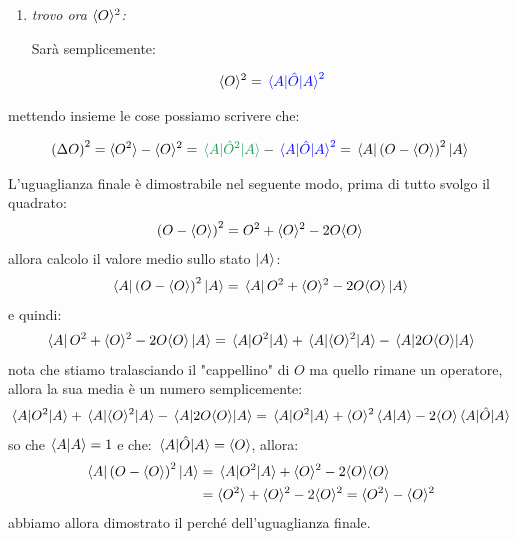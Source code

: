 \begin{itemize}
\begin{enumerate}[label=\arabic*)]
		
	\item \textit{trovo ora $\langle O \rangle^2$:}
		
		Sarà semplicemente:
	
	\begin{align*}
		\langle O \rangle^2 = \textcolor{blue}{\mel{A}{\hat{O}}{A}^2}
	\end{align*}
		
\end{enumerate}

	mettendo insieme le cose possiamo scrivere che:

\begin{nb}
\begin{align*}
	\qty(\Delta O)^2 = \mean{O^2} -\mean{O}^2 =  \textcolor{ForestGreen}{\mel{A}{\hat{O}^2}{A}} - \textcolor{blue}{\mel{A}{\hat{O}}{A}^2} = \mel{A}{ \, \qty(O - \mean{O})^2 \,}{A}
\end{align*}
\end{nb}

\begin{myprf}
	L'uguaglianza finale è dimostrabile nel seguente modo, prima di tutto svolgo il quadrato:
\begin{align*}
	\qty(O - \langle O \rangle)^2 = O^2 + \langle O \rangle^2 - 2O\langle O \rangle
\end{align*}
	allora calcolo il valore medio sullo stato $\ket{A}$:
\begin{align*}
	\mel{A}{\, \qty(O - \langle O \rangle)^2 \, }{A} = \mel{A}{\,  O^2 + \langle O \rangle^2 - 2O\langle O \rangle \, }{A}
\end{align*}
	e quindi:
\begin{align*}
	\mel{A}{\,  O^2 + \langle O \rangle^2 - 2O\langle O \rangle \, }{A} = \mel{A}{O^2}{A} + \mel{A}{\langle O \rangle^2}{A} - \mel{A}{2O\langle O \rangle}{A}
\end{align*}
	nota che stiamo tralasciando il "cappellino" di $O$ ma quello rimane un operatore, allora la sua media è un numero semplicemente:
\begin{align*}
	\mel{A}{O^2}{A} + \mel{A}{\langle O \rangle^2}{A} - \mel{A}{2O\langle O \rangle}{A} = \mel{A}{O^2}{A} + \langle O \rangle^2 \braket{A} - 2\langle O \rangle \mel{A}{\hat{O}}{A}
\end{align*}
	so che $\braket{A} = 1$ e che: $\mel{A}{\hat{O}}{A} = \langle O \rangle$, allora:
\begin{align*}
	\mel{A}{ \, \qty(O - \langle O \rangle)^2 \,}{A} &= \mel{A}{O^2}{A} + \langle O \rangle^2 - 2\langle O \rangle \langle O \rangle \\
	&= \langle O^2 \rangle + \langle O \rangle^2 - 2\langle O \rangle^2 = \langle O^2 \rangle - \langle O \rangle^2
\end{align*}
	abbiamo allora dimostrato il perché dell'uguaglianza finale.
\end{myprf}


\end{itemize}
